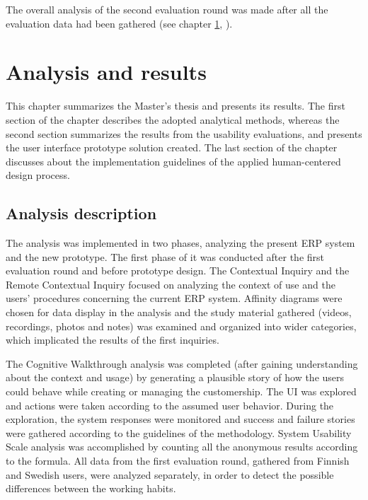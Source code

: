 \documentclass[12pt,a4paper,oneside,pdftex]{report}
\begin{document}
The overall analysis of the second evaluation round was made after all the evaluation data had been gathered  (see chapter \ref{chapter:analysis}, ). 
    	
\chapter{Analysis and results}
\label{chapter:analysis}

This chapter summarizes the Master's thesis and presents its results. The first section of the chapter describes the adopted analytical methods, whereas the second section summarizes the results from the usability evaluations, and presents the user interface prototype solution created. The last section of the chapter discusses about the implementation guidelines of the applied human-centered design process. 

\section{Analysis description}
\label{sec:analysismethods}
The analysis was implemented in two phases, analyzing the present ERP system and the new prototype. The first phase of it was conducted after the first evaluation round and before prototype design. The Contextual Inquiry and the Remote Contextual Inquiry focused on analyzing the context of use and the users' procedures concerning the current ERP system. Affinity diagrams were chosen for data display in the analysis and the study material gathered (videos, recordings, photos and notes) was examined and organized into wider categories, which implicated the results of the first inquiries. 

The Cognitive Walkthrough analysis was completed (after gaining understanding about the context and usage) by generating a plausible story of how the users could behave while creating or managing the customership. The UI was explored and actions were taken according to the assumed user behavior. During the exploration, the system responses were monitored and success and failure stories were gathered according to the guidelines of the methodology. System Usability Scale analysis was accomplished by counting all the anonymous results according to the formula. All data from the first evaluation round, gathered from Finnish and Swedish users, were analyzed separately, in order to detect the possible differences between the working habits.
\end{document}

